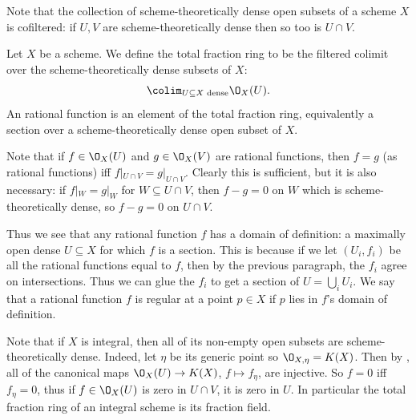 Note that the collection of scheme-theoretically dense open subsets of a scheme $X$ is cofiltered: if $U,V$ are scheme-theoretically dense then so too is $U\cap V$.

\bdefn

    Let $X$ be a scheme.
    We define the {\emphcolor total fraction ring} to be the filtered colimit over the scheme-theoretically dense subsets of $X$:
    $$ \colim_{U\subseteq X\text{ dense}}\O_X(U) . $$
    An {\emphcolor rational function} is an element of the total fraction ring, equivalently a section over a scheme-theoretically dense open subset of $X$.

\edefn

Note that if $f\in\O_X(U)$ and $g\in\O_X(V)$ are rational functions, then $f=g$ (as rational functions) iff $f|_{U\cap V}=g|_{U\cap V}$.
Clearly this is sufficient, but it is also necessary: if $f|_W=g|_W$ for $W\subseteq U\cap V$, then $f-g=0$ on $W$ which is scheme-theoretically dense, so $f-g=0$ on $U\cap V$.

Thus we see that any rational function $f$ has a {\emphcolor domain of definition}: a maximally open dense $U\subseteq X$ for which $f$ is a section.
This is because if we let $(U_i,f_i)$ be all the rational functions equal to $f$, then by the previous paragraph, the $f_i$ agree on intersections.
Thus we can glue the $f_i$ to get a section of $U=\bigcup_iU_i$.
We say that a rational function $f$ is {\emphcolor regular} at a point $p\in X$ if $p$ lies in $f$'s domain of definition.

Note that if $X$ is integral, then all of its non-empty open subsets are scheme-theoretically dense.
Indeed, let $\eta$ be its generic point so $\O_{X,\eta}=K(X)$.
Then by , all of the canonical maps $\O_X(U)\to K(X)$, $f\mapsto f_\eta$, are injective.
So $f=0$ iff $f_\eta=0$, thus if $f\in\O_X(U)$ is zero in $U\cap V$, it is zero in $U$.
In particular the total fraction ring of an integral scheme is its fraction field.

